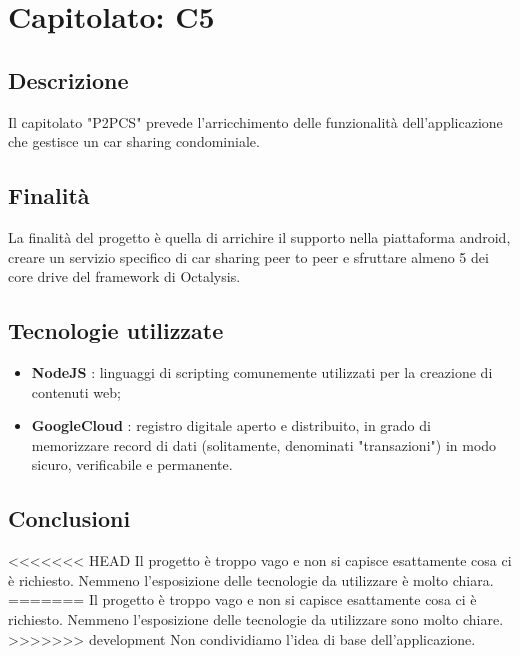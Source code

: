 \section{Capitolato: C5}
	\subsection{Descrizione}
		Il capitolato "P2PCS" prevede l'arricchimento delle funzionalità dell'applicazione che gestisce un car sharing condominiale.
	\subsection{Finalità}
		La finalità del progetto è quella di arrichire il supporto nella piattaforma android, creare un servizio specifico di car sharing peer to peer e sfruttare almeno 5 dei core drive del framework di Octalysis.
	\subsection{Tecnologie utilizzate}
		\begin{itemize}
			\item \textbf{NodeJS} : linguaggi di scripting comunemente utilizzati per la creazione di contenuti web;
			\item \textbf{GoogleCloud} : registro digitale aperto e distribuito, in grado di memorizzare record di dati (solitamente, denominati "transazioni") in modo sicuro, verificabile e permanente.
		\end{itemize}
	\subsection{Conclusioni}
<<<<<<< HEAD
		Il progetto è troppo vago e non si capisce esattamente cosa ci è richiesto. Nemmeno l'esposizione delle tecnologie da utilizzare è molto chiara.
=======
		Il progetto è troppo vago e non si capisce esattamente cosa ci è richiesto. Nemmeno l'esposizione delle tecnologie da utilizzare sono molto chiare.
>>>>>>> development
		Non condividiamo l'idea di base dell'applicazione. 
